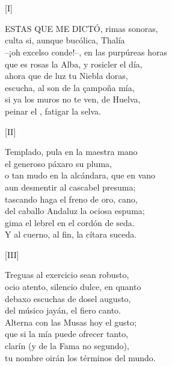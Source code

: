 \documentclass[11pt,a4paper,twoside]{article}
\begin{document}
\section*{\centering\fontsize{11}{14}\selectfont[DEDICATORIA]}
\vspace{-1em}
%
\begin{center}
	[I]
\end{center}
\beginnumbering
\pstart
{\fontsize{9}{11}\selectfont ESTAS QUE ME DICTÓ}, rimas sonoras,\\
culta si, aunque bucólica, Thalía\\
--¡oh excelso conde!--, en las purpúreas horas\\
que es rosas la Alba, y rosicler el día,\\
ahora que de luz tu Niebla doras,\\
escucha, al son de la çampoña mía,\\
si ya los muros no te ven, de Huelva,\\
peinar el , fatigar la selva.\par\pend
%
\begin{center}
	[II]
\end{center}
\pstart
Templado, pula en la maestra mano\\
el generoso páxaro su pluma,\\
o tan mudo en la alcándara, que en vano\\
aun desmentir al cascabel presuma;\\
tascando haga el freno de oro, cano,\\
del caballo Andaluz la ociosa espuma;\\
gima el lebrel en el cordón de seda.\\
Y al cuerno, al fin, la cítara suceda.\par\pend
%
\begin{center}
	[III]
\end{center}
\pstart
Treguas al exercicio sean robusto,\\
ocio atento, silencio dulce, en quanto\\
debaxo escuchas de dosel augusto,\\
del músico jayán, el fiero canto.\\
Alterna con las Musas hoy el gusto;\\
que si la mía puede ofrecer tanto,\\
clarín (y de la Fama no segundo),\\
tu nombre oirán los términos del mundo.\par\pend
%
\end{document}

